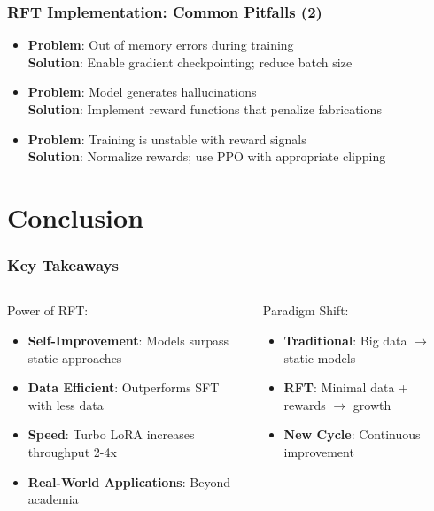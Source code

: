 \documentclass[aspectratio=169]{beamer}
\begin{document}
\begin{frame}
	\frametitle{RFT Implementation: Common Pitfalls (2)}
	\begin{itemize}
		\item \textbf{Problem}: Out of memory errors during training\\
		  \textbf{Solution}: Enable gradient checkpointing; reduce batch size
		\item \textbf{Problem}: Model generates hallucinations\\
		  \textbf{Solution}: Implement reward functions that penalize fabrications
		\item \textbf{Problem}: Training is unstable with reward signals\\
		  \textbf{Solution}: Normalize rewards; use PPO with appropriate clipping
	\end{itemize}
\end{frame}

\section{Conclusion}

\begin{frame}[shrink=60]
	\frametitle{Key Takeaways}
	\vspace{-0.2cm}
	\begin{columns}[T]
		\begin{column}{0.48\textwidth}
			\begin{block}{Power of RFT:}
				\begin{itemize}\setlength{\itemsep}{-0.1em}
					\item \textbf{Self-Improvement}: Models surpass static approaches
					\item \textbf{Data Efficient}: Outperforms SFT with less data
					\item \textbf{Speed}: Turbo LoRA increases throughput 2-4x
					\item \textbf{Real-World Applications}: Beyond academia
				\end{itemize}
			\end{block}
		\end{column}
		\begin{column}{0.48\textwidth}
			\begin{block}{Paradigm Shift:}
				\begin{itemize}\setlength{\itemsep}{-0.1em}
					\item \textbf{Traditional}: Big data $\rightarrow$ static models
					\item \textbf{RFT}: Minimal data + rewards $\rightarrow$ growth
					\item \textbf{New Cycle}: Continuous improvement
				\end{itemize}
			\end{block}
		\end{column}
	\end{columns}
\end{frame}
\end{document}
